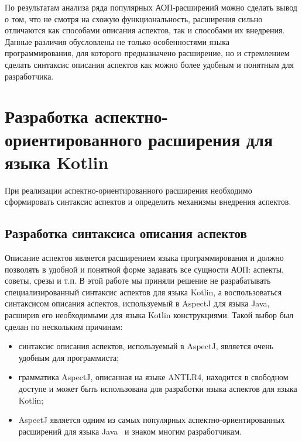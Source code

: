 \documentclass[conference]{IEEEtran}
\begin{document}

По результатам анализа ряда популярных АОП-расширений можно сделать вывод о том,
что не смотря на схожую функциональность, расширения сильно отличаются как
способами описания аспектов, так и способами их внедрения.
Данные различия обусловлены не только особенностями языка
программирования, для которого предназначено расширение, но и стремлением
сделать синтаксис описания аспектов как можно более удобным и понятным для
разработчика.


\section{Разработка аспектно-ориентированного расширения для языка Kotlin}

При реализации аспектно-ориентированного расширения необходимо сформировать
синтаксис аспектов и определить механизмы внедрения аспектов.

\subsection{Разработка синтаксиса описания аспектов}

Описание аспектов является расширением языка программирования и должно позволять
в удобной и понятной форме задавать все сущности АОП: аспекты, советы, срезы и
т.п.
В этой работе мы приняли решение не разрабатывать специализированный синтаксис 
аспектов для языка Kotlin, а воспользоваться синтаксисом описания аспектов, используемый в AspectJ для языка Java, расширив его необходимыми для языка Kotlin конструкциями.
Такой выбор был сделан по нескольким причинам:
\begin{itemize}
	\item синтаксис описания аспектов, используемый в AspectJ, является очень
		  удобным для программиста;
	\item грамматика AspectJ, описанная на языке ANTLR4, находится
		  в свободном доступе и может быть использована для разработки
		  языка аспектов для языка Kotlin;
	\item AspectJ является одним из самых популярных аспектно-ориентированных
		  расширений для языка Java~\cite{aspect_review} и знаком многим
		  разработчикам.
\end{itemize}
\end{document}
